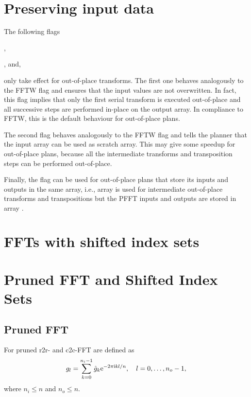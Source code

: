 \section{Preserving input data}
The following flags
\begin{compactitem}
  \item {},
  \item {}, and,
  \item {}
\end{compactitem}
only take effect for out-of-place transforms.
The first one behaves analogously to the FFTW flag  and ensures that the input values are not overwritten.
In fact, this flag implies that only the first serial transform is executed out-of-place and all
successive steps are performed in-place on the output array.
In compliance to FFTW, this is the default behaviour for out-of-place plans.

The second flag behaves analogously to the FFTW flag  and tells the planner that
the input array can be used as scratch array. This may give some speedup for out-of-place plans,
because all the intermediate transforms and transposition steps can be performed out-of-place.

Finally, the flag  can be used for out-of-place plans that store its inputs and outputs in the same array,
i.e., array  is used for intermediate out-of-place transforms and transpositions but the PFFT inputs and outputs are stored in array .


\section{FFTs with shifted index sets}
\begin{compactitem}
  \item {}
  \item {}
\end{compactitem}

\section{Pruned FFT and Shifted Index Sets}
\subsection{Pruned FFT}
For pruned r2r- and c2c-FFT are defined as
\begin{equation*}
  g_l = \sum_{k=0}^{n_i-1} \hat g_k \mathrm{e}^{-2\pi{\ensuremath{\text{\scriptsize{i}}}} kl/n}, \quad l=0,\hdots,n_o-1,
\end{equation*}
where $n_i\le n$ and $n_o\le n$.

